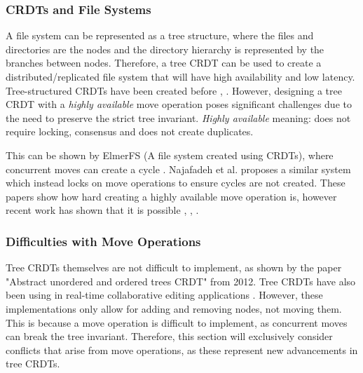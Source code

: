 \documentclass[12pt]{article}
\begin{document}
\subsubsection{CRDTs and File Systems}
A file system can be represented as a tree structure, where the files and directories are the nodes and the directory hierarchy is represented by the branches between nodes. Therefore, a tree CRDT can be used to create a distributed/replicated file system that will have high availability and low latency. Tree-structured CRDTs have been created before \cite{10.1145/2757667.2757683}, \cite{kleppmann2018automerge}. However, designing a tree CRDT with a \textit{highly available} move operation poses significant challenges due to the need to preserve the strict tree invariant. \textit{Highly available} meaning: does not require locking, consensus and does not create duplicates.   \par

This can be shown by ElmerFS (A file system created using CRDTs), where concurrent moves can create a cycle \cite{10.1145/3465332.3470872}. Najafadeh et al. \cite{Najafzadeh0E18} proposes a similar system which instead locks on move operations to ensure cycles are not created. These papers show how hard creating a highly available move operation is, however recent work has shown that it is possible \cite{9563274}, \cite{https://doi.org/10.48550/arxiv.2103.04828}, \cite{https://doi.org/10.48550/arxiv.1805.04263}. \par

\subsubsection{Difficulties with Move Operations}
Tree CRDTs themselves are not difficult to implement, as shown by the paper "Abstract unordered and ordered trees CRDT" \cite{martin2012abstract} from 2012. Tree CRDTs have also been using in real-time collaborative editing applications \cite{5158449}. However, these implementations only allow for adding and removing nodes, not moving them. This is because a move operation is difficult to implement, as concurrent moves can break the tree invariant. Therefore, this section will exclusively consider conflicts that arise from move operations, as these represent new advancements in tree CRDTs. 
\end{document}
